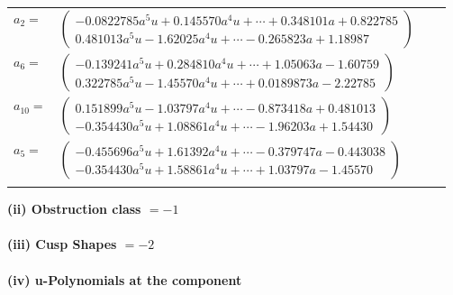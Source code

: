 \documentclass[1p]{elsarticle_modified}
\theoremstyle{definition}
\begin{document}
\begin{tabular}{m{7pt} m{180pt} m{7pt} m{180pt} }
\flushright $a_{2}=$&$\begin{pmatrix}-0.0822785 a^{5} u+0.145570 a^{4} u+\cdots+0.348101 a+0.822785\\0.481013 a^{5} u-1.62025 a^{4} u+\cdots-0.265823 a+1.18987\end{pmatrix}$ \\
\flushright $a_{6}=$&$\begin{pmatrix}-0.139241 a^{5} u+0.284810 a^{4} u+\cdots+1.05063 a-1.60759\\0.322785 a^{5} u-1.45570 a^{4} u+\cdots+0.0189873 a-2.22785\end{pmatrix}$ \\
\flushright $a_{10}=$&$\begin{pmatrix}0.151899 a^{5} u-1.03797 a^{4} u+\cdots-0.873418 a+0.481013\\-0.354430 a^{5} u+1.08861 a^{4} u+\cdots-1.96203 a+1.54430\end{pmatrix}$ \\
\flushright $a_{5}=$&$\begin{pmatrix}-0.455696 a^{5} u+1.61392 a^{4} u+\cdots-0.379747 a-0.443038\\-0.354430 a^{5} u+1.58861 a^{4} u+\cdots+1.03797 a-1.45570\end{pmatrix}$\\&\end{tabular}
\flushleft \textbf{(ii) Obstruction class $= -1$}\\~\\
\flushleft \textbf{(iii) Cusp Shapes $= -2$}\\~\\
\newpage\renewcommand{\arraystretch}{1}
\flushleft \textbf{(iv) u-Polynomials at the component}\newline \\
\end{document}

